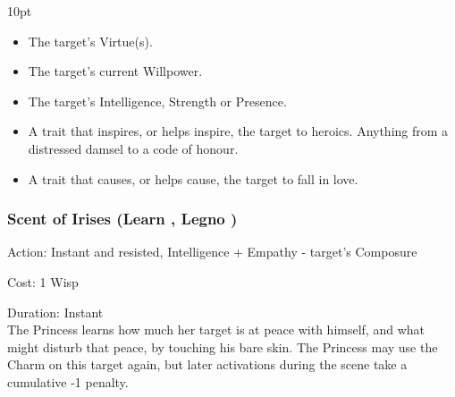 \begin{myindentpar}{10pt}
\begin{itemize}
 \item The target's Virtue(s).
 \item The target's current Willpower.
 \item The target's Intelligence, Strength or Presence.
 \item A trait that inspires, or helps inspire, the target to heroics. Anything from a distressed damsel to a code of honour. 
 \item A trait that causes, or helps cause, the target to fall in love. 
 \end{itemize}\end{myindentpar}

\subsubsection*{Scent of Irises (Learn \textbullet\textbullet, Legno \textbullet)}

\noindent Action: Instant and resisted, Intelligence + Empathy - target's Composure

\noindent Cost: 1 Wisp

\noindent Duration: Instant\\

\noindent The Princess learns how much her target is at peace with himself, and what might disturb that peace, by touching his bare skin. The Princess may use the Charm on this target again, but later activations during the scene take a cumulative -1 penalty.


